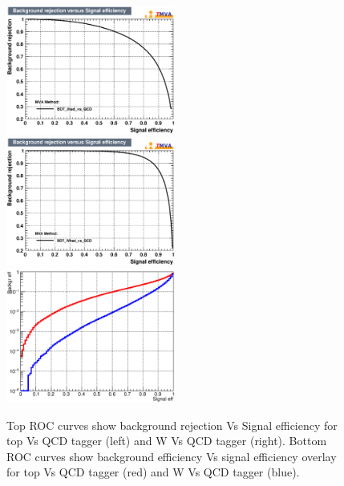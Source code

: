 \documentclass{cernrep}
\begin{document}
\begin{figure}[!htb]\centering
\includegraphics[width=0.495\textwidth]{Fig/TMVA/thad_vs_QCD/rejBvsS.eps}
\includegraphics[width=0.495\textwidth]{Fig/TMVA/Whad_vs_QCD/rejBvsS.eps}
\includegraphics[width=0.495\textwidth]{Fig/TMVA/effQCD_vs_effWhadBlue_thadRed_log.eps}
\caption{Top ROC curves show background rejection Vs Signal efficiency for top Vs QCD tagger (left) and W Vs QCD tagger (right). Bottom ROC curves show background efficiency Vs signal efficiency overlay for top Vs QCD tagger (red) and W Vs QCD tagger (blue).}
\label{fig:TMVA_ROC}
\end{figure}
\end{document}
